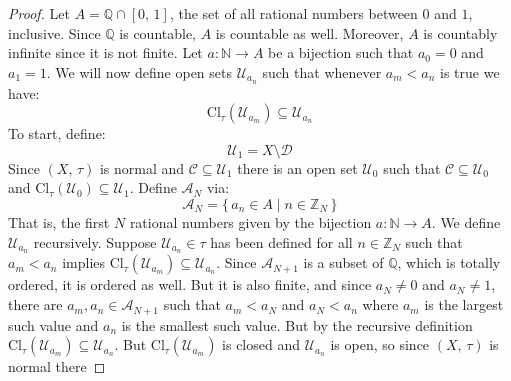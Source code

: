 \documentclass{article}
\theoremstyle{plain}
\theoremstyle{normal}
\begin{document}
        \begin{proof}
            Let $A=\mathbb{Q}\cap[0,\,1]$, the set of all rational numbers
            between $0$ and $1$, inclusive. Since $\mathbb{Q}$ is countable,
            $A$ is countable as well. Moreover, $A$ is countably infinite since
            it is not finite. Let $a:\mathbb{N}\rightarrow{A}$ be a bijection
            such that $a_{0}=0$ and $a_{1}=1$. We will now define open sets
            $\mathcal{U}_{a_{n}}$ such that whenever $a_{m}<a_{n}$ is true
            we have:
            \begin{equation}
                \textrm{Cl}_{\tau}(\mathcal{U}_{a_{m}})
                \subseteq\mathcal{U}_{a_{n}}
            \end{equation}
            To start, define:
            \begin{equation}
                \mathcal{U}_{1}=X\setminus\mathcal{D}
            \end{equation}
            Since $(X,\,\tau)$ is normal and
            $\mathcal{C}\subseteq\mathcal{U}_{1}$ there is an open
            set $\mathcal{U}_{0}$ such that
            $\mathcal{C}\subseteq\mathcal{U}_{0}$ and
            $\textrm{Cl}_{\tau}(\mathcal{U}_{0})\subseteq\mathcal{U}_{1}$.
            Define $\mathcal{A}_{N}$ via:
            \begin{equation}
                \mathcal{A}_{N}=\{\,a_{n}\in{A}\;|\;n\in\mathbb{Z}_{N}\,\}
            \end{equation}
            That is, the first $N$ rational numbers given by the bijection
            $a:\mathbb{N}\rightarrow{A}$. We define $\mathcal{U}_{a_{n}}$
            recursively. Suppose $\mathcal{U}_{a_{n}}\in\tau$ has been defined
            for all $n\in\mathbb{Z}_{N}$ such that $a_{m}<a_{n}$ implies
            $\textrm{Cl}_{\tau}(\mathcal{U}_{a_{m}})\subseteq\mathcal{U}_{a_{n}}$.
            Since $\mathcal{A}_{N+1}$ is a subset of $\mathbb{Q}$, which is
            totally ordered, it is ordered as well. But it is also finite, and
            since $a_{N}\ne{0}$ and $a_{N}\ne{1}$, there are
            $a_{m},a_{n}\in\mathcal{A}_{N+1}$ such that
            $a_{m}<a_{N}$ and $a_{N}<a_{n}$ where $a_{m}$ is the largest
            such value and $a_{n}$ is the smallest such value. But by the
            recursive definition
            $\textrm{Cl}_{\tau}(\mathcal{U}_{a_{m}})\subseteq\mathcal{U}_{a_{n}}$.
            But $\textrm{Cl}_{\tau}(\mathcal{U}_{a_{m}})$ is closed and
            $\mathcal{U}_{a_{n}}$ is open, so since $(X,\,\tau)$ is normal there

\end{proof}
\end{document}
